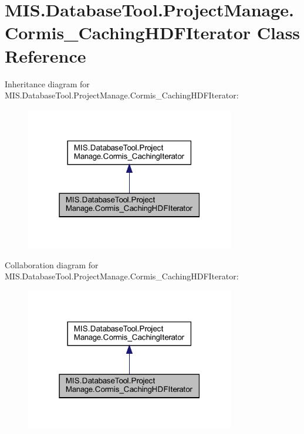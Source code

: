 \hypertarget{classMIS_1_1DatabaseTool_1_1ProjectManage_1_1Cormis__CachingHDFIterator}{}\section{M\+I\+S.\+Database\+Tool.\+Project\+Manage.\+Cormis\+\_\+\+Caching\+H\+D\+F\+Iterator Class Reference}
\label{classMIS_1_1DatabaseTool_1_1ProjectManage_1_1Cormis__CachingHDFIterator}


Inheritance diagram for M\+I\+S.\+Database\+Tool.\+Project\+Manage.\+Cormis\+\_\+\+Caching\+H\+D\+F\+Iterator\+:\nopagebreak
\begin{figure}[H]
\begin{center}
\leavevmode
\includegraphics[width=259pt]{classMIS_1_1DatabaseTool_1_1ProjectManage_1_1Cormis__CachingHDFIterator__inherit__graph}
\end{center}
\end{figure}


Collaboration diagram for M\+I\+S.\+Database\+Tool.\+Project\+Manage.\+Cormis\+\_\+\+Caching\+H\+D\+F\+Iterator\+:\nopagebreak
\begin{figure}[H]
\begin{center}
\leavevmode
\includegraphics[width=259pt]{classMIS_1_1DatabaseTool_1_1ProjectManage_1_1Cormis__CachingHDFIterator__coll__graph}
\end{center}
\end{figure}
